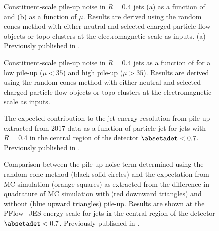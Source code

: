 \begin{figure}[t]
    \caption{Constituent-scale pile-up noise in \antikt $R=0.4$ jets (a) as a function of \absetadet and (b) as a function of $\mu$. Results are derived using the random cones method with either neutral and selected charged particle flow objects or topo-clusters at the electromagnetic scale as inputs. (a)
        Previously published in .}
    \label{fig:const-scale-noise-results}
\end{figure}

\begin{figure}[t]
\caption{Constituent-scale pile-up noise in \antikt $R=0.4$ jets as a function of \absetadet for a low pile-up ($\mu < 35$) and high pile-up ($\mu > 35$). Results are derived using the random cones method with either neutral and selected charged particle flow objects or topo-clusters at the electromagnetic scale as inputs.}
\label{fig:const-scale-noise-pileup-dependence}
\end{figure}



\begin{figure}[t]
    \caption{The expected contribution to the jet energy resolution from pile-up extracted from 2017 data as a function of particle-jet \pT for \antikt jets with $R = 0.4$ in the central region of the detector $\absetadet < 0.7$. Previously published in .}
    \label{fig:pile-up-jer-vs-pt}
\end{figure}



\begin{figure}[t]
    \caption{Comparison between the pile-up noise term \Npileup determined using the random cone method (black solid circles) and the expectation from MC simulation (orange squares) as extracted from the difference in quadrature of MC simulation with (red downward triangles) and without (blue upward triangles) pile-up. Results are shown at the PFlow+JES energy scale for jets in the central region of the detector $\absetadet < 0.7$. Previously published in .}
    \label{fig:non-closure}
\end{figure}



